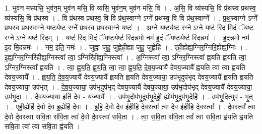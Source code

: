 \documentclass[17pt]{extarticle}
\begin{document}
1. भुव॑न मस्यसि॒ भुव॑न॒म् भुव॑न मसि॒ वि व्य॑सि॒ भुव॑न॒म् भुव॑न मसि॒ वि । . अ॒सि॒ वि व्य॑स्यसि॒ वि प्र॑थस्व प्रथस्व॒ व्य॑स्यसि॒ वि प्र॑थस्व । . वि प्र॑थस्व प्रथस्व॒ वि वि प्र॑थ॒स्वाग्ने ऽग्ने᳚ प्रथस्व॒ वि वि प्र॑थ॒स्वाग्ने᳚ । . प्र॒थ॒स्वाग्ने ऽग्ने᳚ प्रथस्व प्रथ॒स्वाग्ने॒ यष्ट॒र्यष्ट॒ रग्ने᳚ प्रथस्व प्रथ॒स्वाग्ने॒ यष्टः॑ । . अग्ने॒ यष्ट॒र्यष्ट॒ रग्ने ऽग्ने॒ यष्ट॑ रि॒द मि॒दं ॅयष्ट॒ रग्ने ऽग्ने॒ यष्ट॑ रि॒दम् । . यष्ट॑ रि॒द मि॒दं ॅयष्ट॒र्यष्ट॑ रि॒दन्नमो॒ नम॑ इ॒दं ॅयष्ट॒र्यष्ट॑ रि॒दन्नमः॑ । . इ॒दन्नमो॒ नम॑ इ॒द मि॒दन्नमः॑ । . नम॒ इति॒ नमः॑ । . जुह्वा जुहु॒ जुह्वेही॒ह्या जुहु॒ जुह्वेहि॑ । . एही॒ह्येह्य॒ग्निर॒ग्निरि॒ह्येह्य॒ग्निः । . इ॒ह्य॒ग्निर॒ग्निरि॑हीह्य॒ग्निस्त्वा᳚ त्वा॒ ऽग्निरि॑हीह्य॒ग्निस्त्वा᳚ । . अ॒ग्निस्त्वा᳚ त्वा॒ ऽग्निर॒ग्निस्त्वा᳚ ह्वयति ह्वयति त्वा॒ ऽग्निर॒ग्निस्त्वा᳚ ह्वयति । . त्वा॒ ह्व॒य॒ति॒ ह्व॒य॒ति॒ त्वा॒ त्वा॒ ह्व॒य॒ति॒ दे॒व॒य॒ज्यायै॑ देवय॒ज्यायै᳚ ह्वयति त्वा त्वा ह्वयति देवय॒ज्यायै᳚ । . ह्व॒य॒ति॒ दे॒व॒य॒ज्यायै॑ देवय॒ज्यायै᳚ ह्वयति ह्वयति देवय॒ज्याया॒ उप॑भृ॒दुप॑भृद् देवय॒ज्यायै᳚ ह्वयति ह्वयति देवय॒ज्याया॒ उप॑भृत् । . दे॒व॒य॒ज्याया॒ उप॑भृ॒दुप॑भृद् देवय॒ज्यायै॑ देवय॒ज्याया॒ उप॑भृ॒दोप॑भृद् देवय॒ज्यायै॑ देवय॒ज्याया॒ उप॑भृ॒दा । . दे॒व॒य॒ज्याया॒ इति॑ देव - य॒ज्यायै᳚ । . उप॑भृ॒दोप॑भृ॒दुप॑भृ॒देही॒ ह्योप॑भृ॒दुप॑भृ॒देहि॑ । . उप॑भृ॒दित्युप॑ - भृ॒त् । . एही॒ह्येहि॑ दे॒वो दे॒व इ॒ह्येहि॑ दे॒वः । . इ॒हि॒ दे॒वो दे॒व इ॑हीहि दे॒वस्त्वा᳚ त्वा दे॒व इ॑हीहि दे॒वस्त्वा᳚ । . दे॒वस्त्वा᳚ त्वा दे॒वो दे॒वस्त्वा॑ सवि॒ता स॑वि॒ता त्वा॑ दे॒वो दे॒वस्त्वा॑ सवि॒ता । . त्वा॒ स॒वि॒ता स॑वि॒ता त्वा᳚ त्वा सवि॒ता ह्व॑यति ह्वयति सवि॒ता त्वा᳚ त्वा सवि॒ता ह्व॑यति । \newline
\end{document}
